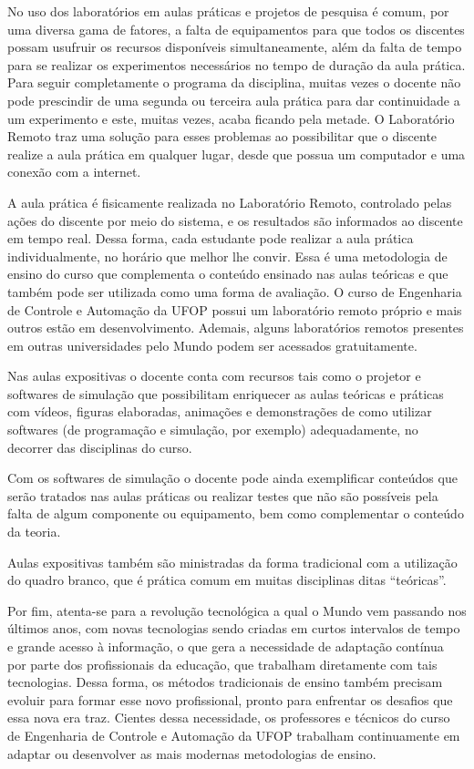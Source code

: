 \documentclass[
	12pt,				%
	openright,			%
	oneside,			%
	a4paper,			%
	english,			%
	brazil				%
	]{abntex2}
\begin{document}
No uso dos laboratórios em aulas práticas e projetos de pesquisa é comum, por uma diversa gama de fatores, a falta de equipamentos para que todos os discentes possam usufruir os recursos disponíveis simultaneamente, além da falta de tempo para se realizar os experimentos necessários no tempo de duração da aula prática. Para seguir completamente o programa da disciplina, muitas vezes o docente não pode prescindir de uma segunda ou terceira aula prática para dar continuidade a um experimento e este, muitas vezes, acaba ficando pela metade. O Laboratório Remoto traz uma solução para esses problemas ao possibilitar que o discente realize a aula prática em qualquer lugar, desde que possua um computador e uma conexão com a internet.

A aula prática é fisicamente realizada no Laboratório Remoto, controlado pelas ações do discente por meio do sistema, e os resultados são informados ao discente em tempo real. Dessa forma, cada estudante pode realizar a aula prática individualmente, no horário que melhor lhe convir. Essa é uma metodologia de ensino do curso que complementa o conteúdo ensinado nas aulas teóricas e que também pode ser utilizada como uma forma de avaliação. O curso de Engenharia de Controle e Automação da UFOP possui um laboratório remoto próprio e mais outros estão em desenvolvimento. Ademais, alguns laboratórios remotos presentes em outras universidades pelo Mundo podem ser acessados gratuitamente.

Nas aulas expositivas o docente conta com recursos tais como o projetor e softwares de simulação que possibilitam enriquecer as aulas teóricas e práticas com vídeos, figuras elaboradas, animações e demonstrações de como utilizar softwares (de programação e simulação, por exemplo) adequadamente, no decorrer das disciplinas do curso.

Com os softwares de simulação o docente pode ainda exemplificar conteúdos que serão tratados nas aulas práticas ou realizar testes que não são possíveis pela falta de algum componente ou equipamento, bem como complementar o conteúdo da teoria.

Aulas expositivas também são ministradas da forma tradicional com a utilização do quadro branco, que é prática comum em muitas disciplinas ditas ``teóricas''.

Por fim, atenta-se para a revolução tecnológica a qual o Mundo vem passando nos últimos anos, com novas tecnologias sendo criadas em curtos intervalos de tempo e grande acesso à informação, o que gera a necessidade de adaptação contínua por parte dos profissionais da educação, que trabalham diretamente com tais tecnologias. Dessa forma, os métodos tradicionais de ensino também precisam evoluir para formar esse novo profissional, pronto para enfrentar os desafios que essa nova era traz. Cientes dessa necessidade, os professores e técnicos do curso de Engenharia de Controle e Automação da UFOP trabalham continuamente em adaptar ou desenvolver as mais modernas metodologias de ensino.
\end{document}
